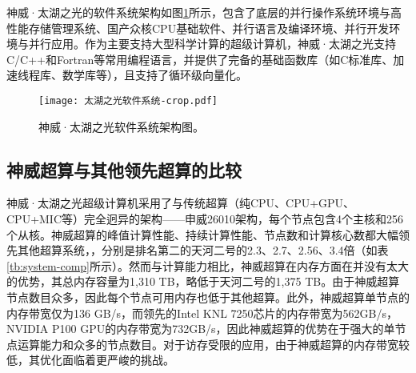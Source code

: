 神威·太湖之光的软件系统架构如图\ref{fig:sunwaysofts}所示，包含了底层的并行操作系统环境与高性能存储管理系统、国产众核CPU基础软件、并行语言及编译环境、并行开发环境与并行应用。作为主要支持大型科学计算的超级计算机，神威·太湖之光支持C/C++和Fortran等常用编程语言，并提供了完备的基础函数库（如C标准库、加速线程库、数学库等），且支持了循环级向量化。

\begin{figure}[ht]
\centering
\texttt{[image: 太湖之光软件系统-crop.pdf]}
\caption{神威·太湖之光软件系统架构图。}
\label{fig:sunwaysofts}
\end{figure}

\subsection{神威超算与其他领先超算的比较}

神威·太湖之光超级计算机采用了与传统超算（纯CPU、CPU+GPU、CPU+MIC等）完全迥异的架构——申威26010架构，每个节点包含4个主核和256个从核。神威超算的峰值计算性能、持续计算性能、节点数和计算核心数都大幅领先其他超算系统，，分别是排名第二的天河二号的2.3、2.7、2.56、3.4倍（如表\ref{tb:system-comp}所示）。然而与计算能力相比，神威超算在内存方面在并没有太大的优势，其总内存容量为1,310 TB，略低于天河二号的1,375 TB。由于神威超算节点数目众多，因此每个节点可用内存也低于其他超算。此外，神威超算单节点的内存带宽仅为136 GB/s，而领先的Intel KNL 7250芯片的内存带宽为562GB/s，NVIDIA P100 GPU的内存带宽为732GB/s，因此神威超算的优势在于强大的单节点运算能力和众多的节点数目。对于访存受限的应用，由于神威超算的内存带宽较低，其优化面临着更严峻的挑战。

\begin{table}[ht]
\centering
\caption{神威·太湖之光超算系统与其他超算系统比较}
\label{tb:system-comp}
\end{table}

